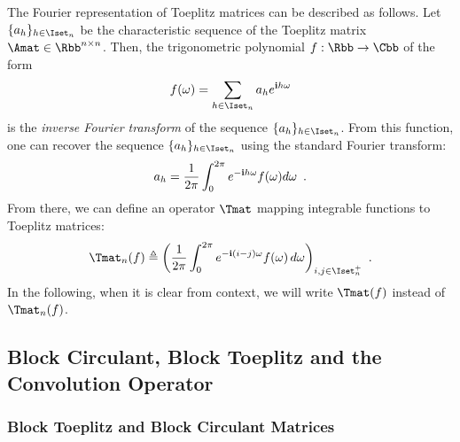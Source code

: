 The Fourier representation of Toeplitz matrices can be described as follows.
Let $\{a_h\}_{h \in \Iset_n}$ be the characteristic sequence of the Toeplitz matrix $\Amat \in \Rbb^{n\times n}$.
Then, the trigonometric polynomial $f: \Rbb \rightarrow \Cbb$ of the form
\begin{equation}
  f(\omega) = \sum_{h \in \Iset_n} a_h e^{\ci h \omega}
\end{equation}
is the \emph{inverse Fourier transform} of the sequence $\{a_h\}_{h \in \Iset_n}$.
From this function, one can recover the sequence $\{a_h\}_{h \in \Iset_n}$ using the standard Fourier transform:
\begin{equation}
  a_h = \frac{1}{2\pi} \int_0^{2\pi} e^{-\mathbf{i} h \omega} f(\omega) d\omega \enspace.
\end{equation}
\noindent
From there, we can define an operator $\Tmat$ mapping integrable functions to Toeplitz matrices:
\begin{equation} \label{equation:ch2-toeplitz_operator}
  \Tmat_n(f) \triangleq \leftmat\frac{1}{2\pi}\int_{0}^{2\pi}e^{-\ci(i-j)\omega}f(\omega)\,d\omega\rightmat_{i,j \in \Iset^+_n} \enspace.
\end{equation}
In the following, when it is clear from context, we will write $\Tmat(f)$ instead of $\Tmat_n(f)$.





\subsection{Block Circulant, Block Toeplitz and the Convolution Operator}
\label{subsection:ch2-block_toeplitz_and_block_circulant_matrices}

\subsubsection{Block Toeplitz and Block Circulant Matrices}
\label{subsubsection:ch2-block_circulant_and_block_toeplitz_matrices}

